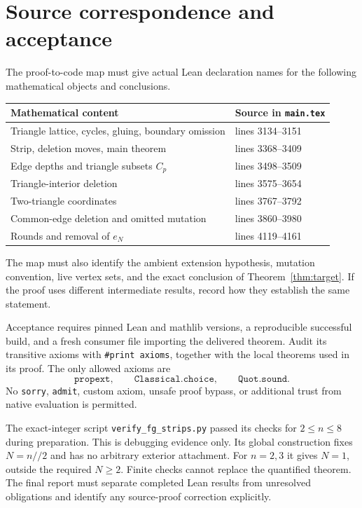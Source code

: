 \documentclass[11pt,a4paper]{article}
\begin{document}
\section{Source correspondence and acceptance}
The proof-to-code map must give actual Lean declaration names for the
following mathematical objects and conclusions.
\begin{center}
\begin{tabular}{@{}p{.58\linewidth}p{.34\linewidth}@{}}
\toprule
Mathematical content & Source in \texttt{main.tex}\\
\midrule
Triangle lattice, cycles, gluing, boundary omission & lines 3134--3151\\
Strip, deletion moves, main theorem & lines 3368--3409\\
Edge depths and triangle subsets $C_p$ & lines 3498--3509\\
Triangle-interior deletion & lines 3575--3654\\
Two-triangle coordinates & lines 3767--3792\\
Common-edge deletion and omitted mutation & lines 3860--3980\\
Rounds and removal of $e_N$ & lines 4119--4161\\
\bottomrule
\end{tabular}
\end{center}
The map must also identify the ambient extension hypothesis, mutation
convention, live vertex sets, and the exact conclusion of
Theorem~\ref{thm:target}. If the proof uses different intermediate results,
record how they establish the same statement.

Acceptance requires pinned Lean and mathlib versions, a reproducible
successful build, and a fresh consumer file importing the delivered theorem.
Audit its transitive axioms with \texttt{\#print axioms}, together with the
local theorems used in its proof. The only allowed axioms are
\[
 \texttt{propext},\qquad \texttt{Classical.choice},\qquad \texttt{Quot.sound}.
\]
No \texttt{sorry}, \texttt{admit}, custom axiom, unsafe proof bypass, or
additional trust from native evaluation is permitted.

The exact-integer script \texttt{verify\_fg\_strips.py} passed its checks for
$2\le n\le8$ during preparation. This is debugging evidence only.
Its global construction fixes $N=n\mathbin{//}2$ and has no arbitrary
exterior attachment. For $n=2,3$ it gives $N=1$, outside the required $N\ge2$.
Finite checks cannot replace the quantified theorem. The final report must
separate completed Lean results from unresolved obligations and identify
any source-proof correction explicitly.
\end{document}
